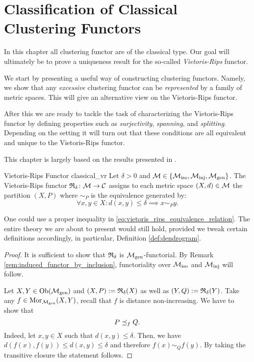 \chapter{Classification of Classical Clustering Functors}
\label{chapter__classical}
In this chapter all clustering functor are of the classical type.
Our goal will ultimately be to prove a uniqueness result for the so-called \emph{Vietoris-Rips} functor.

We start by presenting a useful way of constructing clustering functors. Namely, we show that any \emph{excessive} clustering functor can be \emph{represented} by a family of metric spaces. This will give an alternative view on the Vietoris-Rips functor.

After this we are ready to tackle the task of characterizing the Vietoris-Rips functor by defining properties such as \emph{surjectivity}, \emph{spanning}, and \emph{splitting}. Depending on the setting it will turn out that these conditions are all equivalent and unique to the Vietoris-Rips functor.

This chapter is largely based on the results presented in \cite{Carlsson2010}.

\begin{defprop}{Vietoris-Rips Functor \cite[Def.~6.1]{Carlsson2010}}{classical_vr}
    Let $\delta > 0$ and $\mathcal{M} \in \{{\mathcal{M}_\mathrm{iso}}, {\mathcal{M}_\mathrm{inj}}, {\mathcal{M}_\mathrm{gen}}\}$. The Vietoris-Rips functor $\mathfrak{R}_\delta\colon \mathcal{M} \to \mathcal{C}$ assigns to each metric space $(X,d) \in \mathcal{M}$ the partition $(X,P)$ where $\sim_P$ is the equivalence generated by:
    \begin{equation}
        \label{eq:vietoris_rips_equivalence_relation}
        \forall x,y \in X: d(x,y) \leq \delta \implies x \sim_P y.
    \end{equation}
\end{defprop}


\begin{myremark}{}{}
One could use a proper inequality in \eqref{eq:vietoris_rips_equivalence_relation}. The entire theory we are about to present would still hold, provided we tweak certain definitions accordingly, in particular, Definition \ref{def:dendrogram}.
\end{myremark}

\begin{proof}
It is sufficient to show that $\mathfrak{R}_\delta$ is ${\mathcal{M}_\mathrm{gen}}$-functorial. By Remark \ref{rem:induced_functor_by_inclusion}, functoriality over ${\mathcal{M}_\mathrm{iso}}$ and ${\mathcal{M}_\mathrm{inj}}$ will follow.

Let $X,Y \in \mathrm {Ob}({\mathcal{M}_\mathrm{gen}})$ and $(X,P) := \mathfrak{R}_\delta(X)$ as well as $(Y,Q) := \mathfrak{R}_\delta(Y)$.
Take any $f \in \mathrm {Mor}_{\mathcal{M}_\mathrm{gen}}(X,Y)$, recall that $f$ is distance non-increasing.
We have to show that 
$$P \preceq_f Q.$$
Indeed, let $x,y \in X$ such that $d(x,y) \leq \delta$.
Then, we have $d(f(x), f(y)) \leq d(x,y) \leq \delta$ and therefore $f(x) \sim_{Q} f(y)$.
By taking the transitive closure the statement follows.
\end{proof}

